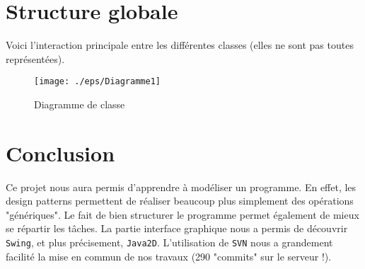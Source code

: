 \documentclass[a4paper]{article}
\begin{document}
\section{Structure globale}
Voici l'interaction principale entre les différentes classes (elles ne sont pas toutes représentées).
\begin{figure}[!h] 					%
        \centering						%
        \texttt{[image: ./eps/Diagramme1]}	%
        \caption{Diagramme de classe}	%
    \end{figure}   
\section{Conclusion}
Ce projet nous aura permis d'apprendre à modéliser un programme. En effet, les design patterns permettent de réaliser beaucoup plus simplement des opérations "génériques". Le fait de bien structurer le programme permet également de mieux se répartir les tâches. La partie interface graphique nous a permis de découvrir \verb+Swing+, et plus précisement, \verb+Java2D+. L'utilisation de \verb+SVN+ nous a grandement facilité la mise en commun de nos travaux (290 "commits" sur le serveur !).
\newpage
\end{document}
